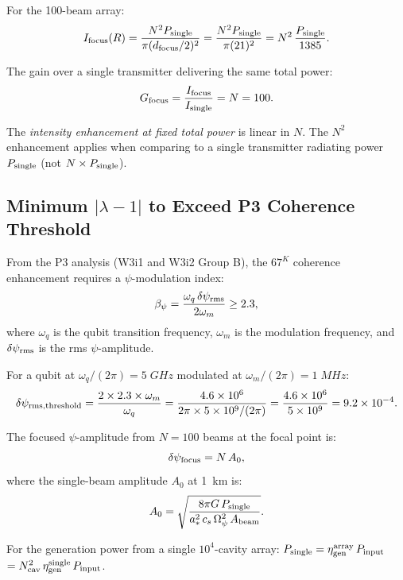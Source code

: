 \documentclass[aps,prd,twocolumn,superscriptaddress]{revtex4-2}
\begin{document}
For the 100-beam array:
\begin{equation}
I_{\rm focus}(R) = \frac{N^2 P_{\rm single}}{\pi(d_{\rm focus}/2)^2}
= \frac{N^2 P_{\rm single}}{\pi(21)^2} = N^2\,\frac{P_{\rm single}}{1385}.
\end{equation}

The gain over a single transmitter delivering the same total power:
\begin{equation}
G_{\rm focus} = \frac{I_{\rm focus}}{I_{\rm single}} = N = 100.
\end{equation}

The \emph{intensity enhancement at fixed total power} is linear in $N$.
The $N^2$ enhancement applies when comparing to a single transmitter
radiating power $P_{\rm single}$ (not $N \times P_{\rm single}$).

\subsection{Minimum $|\lambda-1|$ to Exceed P3 Coherence Threshold}

From the P3 analysis (W3i1 and W3i2 Group B), the $67^K$ coherence
enhancement requires a $\psi$-modulation index:
\begin{equation}
\beta_\psi = \frac{\omega_q\,\delta\psi_{\rm rms}}{2\omega_m} \geq 2.3,
\label{eq:p3-threshold}
\end{equation}
where $\omega_q$ is the qubit transition frequency, $\omega_m$ is the
modulation frequency, and $\delta\psi_{\rm rms}$ is the rms $\psi$-amplitude.

For a qubit at $\omega_q/(2\pi) = 5\;\si{GHz}$ modulated at
$\omega_m/(2\pi) = 1\;\si{MHz}$:
\begin{equation}
\delta\psi_{\rm rms,threshold} = \frac{2\times2.3\times\omega_m}{\omega_q}
= \frac{4.6\times10^6}{2\pi\times5\times10^9/(2\pi)}
= \frac{4.6\times10^6}{5\times10^9} = 9.2\times10^{-4}.
\label{eq:dpsi-threshold}
\end{equation}

The focused $\psi$-amplitude from $N = 100$ beams at the focal point is:
\begin{equation}
\delta\psi_{\rm focus} = N\,A_0,
\end{equation}
where the single-beam amplitude $A_0$ at 1~km is:
\begin{equation}
A_0 = \sqrt{\frac{8\pi G\,P_{\rm single}}{a_*^2\,c_s\,\Omega_\psi^2\,A_{\rm beam}}}.
\end{equation}

For the generation power from a single $10^4$-cavity array:
$P_{\rm single} = \eta_{\rm gen}^{\rm array}\,P_{\rm input}$
$= N_{\rm cav}^2\,\eta_{\rm gen}^{\rm single}\,P_{\rm input}$.
\end{document}
